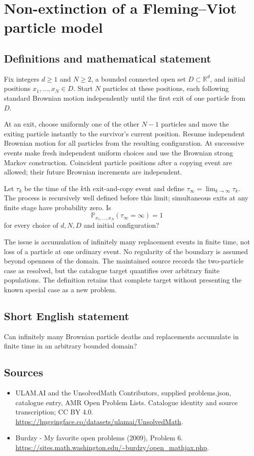 \documentclass[11pt,a4paper]{article}
\begin{document}
\section*{Non-extinction of a Fleming–Viot particle model}\label{statement}

\subsection{Definitions and mathematical statement}
Fix integers $d\ge1$ and $N\ge2$, a bounded connected open set $D\subset\mathbb R^d$, and initial positions $x_1,\ldots,x_N\in D$. Start $N$ particles at these positions, each following standard Brownian motion independently until the first exit of one particle from $D$.

At an exit, choose uniformly one of the other $N-1$ particles and move the exiting particle instantly to the survivor's current position. Resume independent Brownian motion for all particles from the resulting configuration. At successive events make fresh independent uniform choices and use the Brownian strong Markov construction. Coincident particle positions after a copying event are allowed; their future Brownian increments are independent.

Let $\tau_k$ be the time of the $k$th exit-and-copy event and define $\tau_\infty=\lim_{k\to\infty}\tau_k$. The process is recursively well defined before this limit; simultaneous exits at any finite stage have probability zero. Is
\[
\mathbb P_{x_1,\ldots,x_N}(\tau_\infty=\infty)=1
\]
for every choice of $d,N,D$ and initial configuration?

The issue is accumulation of infinitely many replacement events in finite time, not loss of a particle at one ordinary event. No regularity of the boundary is assumed beyond openness of the domain. The maintained source records the two-particle case as resolved, but the catalogue target quantifies over arbitrary finite populations. The definition retains that complete target without presenting the known special case as a new problem.
\subsection{Short English statement}
Can infinitely many Brownian particle deaths and replacements accumulate in finite time in an arbitrary bounded domain?
\subsection{Sources}
\begin{itemize}
\item[S1] ULAM.AI and the UnsolvedMath Contributors, supplied problems.json, catalogue entry, AMR Open Problem Lists. Catalogue identity and source transcription; CC BY 4.0.
\url{https://huggingface.co/datasets/ulamai/UnsolvedMath}.
\item[S2] Burdzy - My favorite open problems (2009), Problem 6. 
\url{https://sites.math.washington.edu/~burdzy/open_mathjax.php}.
\end{itemize}
\end{document}
